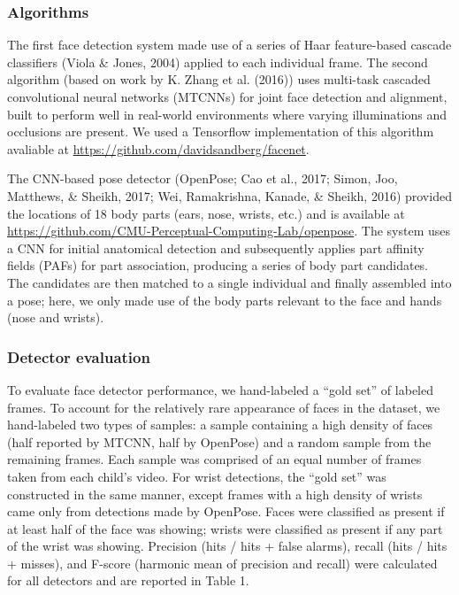 \documentclass[10pt, letterpaper]{article}
\begin{document}
\subsubsection{Algorithms}\label{algorithms}

The first face detection system made use of a series of Haar
feature-based cascade classifiers (Viola \& Jones, 2004) applied to each
individual frame. The second algorithm (based on work by K. Zhang et al.
(2016)) uses multi-task cascaded convolutional neural networks (MTCNNs)
for joint face detection and alignment, built to perform well in
real-world environments where varying illuminations and occlusions are
present. We used a Tensorflow implementation of this algorithm avaliable
at \url{https://github.com/davidsandberg/facenet}.

The CNN-based pose detector (OpenPose; Cao et al., 2017; Simon, Joo,
Matthews, \& Sheikh, 2017; Wei, Ramakrishna, Kanade, \& Sheikh, 2016)
provided the locations of 18 body parts (ears, nose, wrists, etc.) and
is available at
\url{https://github.com/CMU-Perceptual-Computing-Lab/openpose}. The
system uses a CNN for initial anatomical detection and subsequently
applies part affinity fields (PAFs) for part association, producing a
series of body part candidates. The candidates are then matched to a
single individual and finally assembled into a pose; here, we only made
use of the body parts relevant to the face and hands (nose and wrists).

\subsubsection{Detector evaluation}\label{detector-evaluation}

To evaluate face detector performance, we hand-labeled a ``gold set'' of
labeled frames. To account for the relatively rare appearance of faces
in the dataset, we hand-labeled two types of samples: a sample
containing a high density of faces (half reported by MTCNN, half by
OpenPose) and a random sample from the remaining frames. Each sample was
comprised of an equal number of frames taken from each child's video.
For wrist detections, the ``gold set'' was constructed in the same
manner, except frames with a high density of wrists came only from
detections made by OpenPose. Faces were classified as present if at
least half of the face was showing; wrists were classified as present if
any part of the wrist was showing. Precision (hits / hits + false
alarms), recall (hits / hits + misses), and F-score (harmonic mean of
precision and recall) were calculated for all detectors and are reported
in Table 1.
\end{document}
